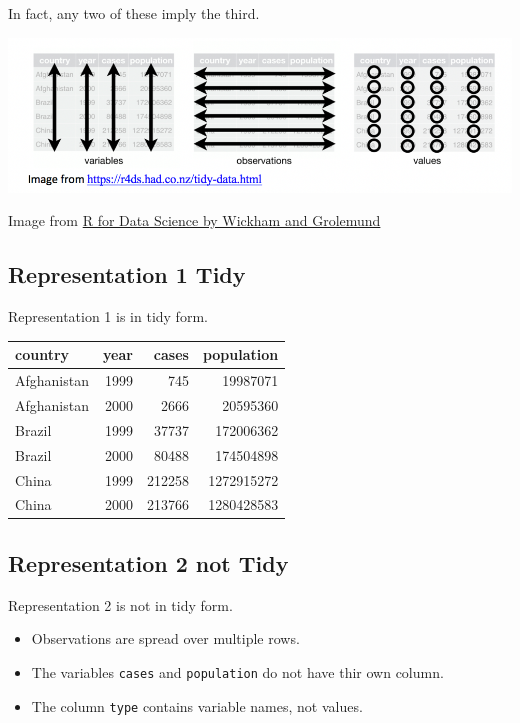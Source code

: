 \documentclass[]{book}
\providecommand{\tightlist}{%
  \setlength{\itemsep}{0pt}\setlength{\parskip}{0pt}}
\begin{document}
In fact, any two of these imply the third.

\includegraphics[width=0.9\linewidth]{Tidy_Data}

Image from \href{https://r4ds.had.co.nz/tidy-data.html}{R for Data
Science by Wickham and Grolemund}

\subsection{Representation 1 Tidy}\label{representation-1-tidy}

Representation 1 is in tidy form.

\begin{tabular}{l|r|r|r}
\hline
country & year & cases & population\\
\hline
Afghanistan & 1999 & 745 & 19987071\\
\hline
Afghanistan & 2000 & 2666 & 20595360\\
\hline
Brazil & 1999 & 37737 & 172006362\\
\hline
Brazil & 2000 & 80488 & 174504898\\
\hline
China & 1999 & 212258 & 1272915272\\
\hline
China & 2000 & 213766 & 1280428583\\
\hline
\end{tabular}

\subsection{Representation 2 not Tidy}\label{representation-2-not-tidy}

Representation 2 is not in tidy form.

\begin{itemize}
\tightlist
\item
  Observations are spread over multiple rows.\\
\item
  The variables \texttt{cases} and \texttt{population} do not have thir
  own column.\\
\item
  The column \texttt{type} contains variable names, not values.
\end{itemize}
\end{document}
